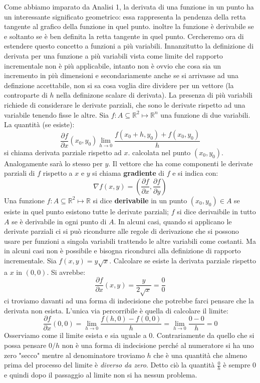 \documentclass[a4paper]{article}
\numberwithin{equation}{subsection}
\begin{document}
Come abbiamo imparato da Analisi 1, la derivata di una funzione in un punto ha un interessante significato geometrico: essa rappresenta la pendenza della retta tangente al grafico della funzione in quel punto.
inoltre la funzione è derivabile se e soltanto se è ben definita la retta tangente in quel punto.
Cercheremo ora di estendere questo concetto a funzioni a più variabili.
Innanzitutto la definizione di derivata per una funzione a più variabili vista come limite del rapporto incrementale non è più applicabile, 
intanto non è ovvio che cosa sia un incremento in più dimensioni e secondariamente anche se si arrivasse ad una definzione accettabile, non si sa cosa voglia dire dividere per un vettore (la controparte di $h$ nella definizone scalare di derivata).
La presenza di più variabili richiede di considerare le derivate parziali, che sono le derivate rispetto ad una variabile tenendo fisse le altre.
\dfn{}
{
    Sia $f : A \subseteq \mathbb{R}^2 \mapsto \mathbb{R}^n$ una funzione di due variabili. La quantità (se esiste):
    \[\frac{\partial f}{\partial x}(x_0, y_0) \lim_{h \rightarrow 0} \frac{f(x_0 + h, y_0) + f(x_0, y_0)}{h}\]
    si chiama derivata parziale rispetto ad $x$. calcolata nel punto $(x_0, y_0)$. Analogamente sarà lo stesso per $y$.  
}
\dfn{}
{
    Il vettore che ha come componenti le derivate parziali di $f$ rispetto a $x$ e $y$ si chiama \textbf{gradiente} di $f$ e si indica con:
    \[\nabla f(x,y) = \left(\frac{\partial f}{\partial x}, \frac{\partial f}{\partial y}\right)\]
}
\dfn{}
{
    Una funzione $f : A \subseteq \mathbb{R}^2 \mapsto \mathbb{R}$ si dice \textbf{derivabile} in un punto $(x_0, y_0) \in A$ se esiste in quel punto esistono tutte le derivate parziali; $f$ si dice derivaibile in tutto $A$ 
    se è derivabile in ogni punto di $A$.
}
\noindent
In alcuni casi, quando si applicano le derivate parziali ci si può ricondurre alle regole di derivazione che si possono usare per funzioni a singola variabili trattendo le altre variabili come costanti.
Ma in alcuni casi non è possibile e bisogna ricondurci alla definizione di rapporto incrementale.
\ex{}
{
    Sia $f(x,y) = y\sqrt{x}$. Calcolare se esiste la derivata parziale rispetto a $x$ in $(0,0)$.
    Si avrebbe:
    \[\frac{\partial f}{\partial x} (x,y) = \frac{y}{2\sqrt{x}} = \frac{0}{0}\]
    ci troviamo davanti ad una forma di indecisione che potrebbe farci pensare che la derivata non esista. L'unica via percorribile è quella di calcolare il limite:
    \[\frac{\partial f}{\partial x}(0,0) = \lim_{h \rightarrow 0} \frac{f(h,0) - f(0,0)}{h} = \lim_{h \rightarrow 0} \frac{0 - 0}{h} = 0\]
    Osserviamo come il limite esista e sia uguale a $0$. Contrariamente da quello che si possa pensare $0/h$ non è una forma di indecisione perché al numeratore si ha uno zero "secco" mentre al denominatore troviamo $h$
    che è una quantità che almeno prima del processo del limite è \textit{diverso da zero}. Detto ciò la quantità $\frac{0}{h}$ è sempre 0 e quindi dopo il passaggio al limite non si ha nessun problema.
}
\end{document}
